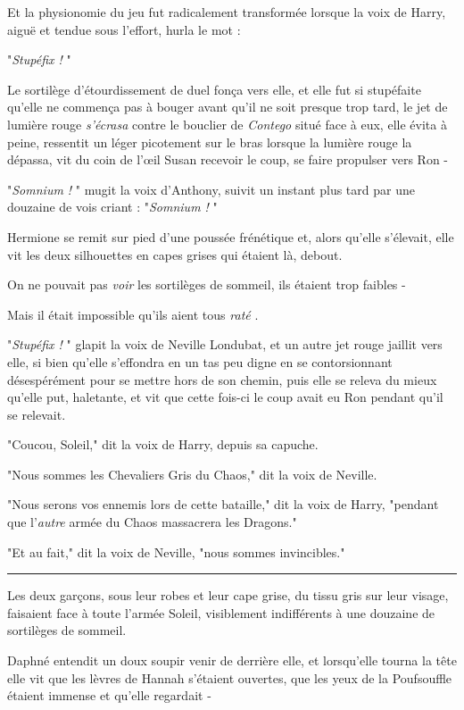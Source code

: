 Et la physionomie du jeu fut radicalement transformée lorsque la voix de Harry, aiguë et tendue sous l'effort, hurla le mot :

"\emph{Stupéfix !} "

Le sortilège d'étourdissement de duel fonça vers elle, et elle fut si stupéfaite qu'elle ne commença pas à bouger avant qu'il ne soit presque trop tard, le jet de lumière rouge \emph{s'écrasa}  contre le bouclier de \emph{Contego}  situé face à eux, elle évita à peine, ressentit un léger picotement sur le bras lorsque la lumière rouge la dépassa, vit du coin de l'œil Susan recevoir le coup, se faire propulser vers Ron -

"\emph{Somnium !} " mugit la voix d'Anthony, suivit un instant plus tard par une douzaine de vois criant : "\emph{Somnium !} "

Hermione se remit sur pied d'une poussée frénétique et, alors qu'elle s'élevait, elle vit les deux silhouettes en capes grises qui étaient là, debout.

On ne pouvait pas \emph{voir}  les sortilèges de sommeil, ils étaient trop faibles -

Mais il était impossible qu'ils aient tous \emph{raté} .

"\emph{Stupéfix !} " glapit la voix de Neville Londubat, et un autre jet rouge jaillit vers elle, si bien qu'elle s'effondra en un tas peu digne en se contorsionnant désespérément pour se mettre hors de son chemin, puis elle se releva du mieux qu'elle put, haletante, et vit que cette fois-ci le coup avait eu Ron pendant qu'il se relevait.

"Coucou, Soleil," dit la voix de Harry, depuis sa capuche.

"Nous sommes les Chevaliers Gris du Chaos," dit la voix de Neville.

"Nous serons vos ennemis lors de cette bataille," dit la voix de Harry, "pendant que l'\emph{autre } armée du Chaos massacrera les Dragons."

"Et au fait," dit la voix de Neville, "nous sommes invincibles."
\par\noindent\rule{\textwidth}{0.4pt}
Les deux garçons, sous leur robes et leur cape grise, du tissu gris sur leur visage, faisaient face à toute l'armée Soleil, visiblement indifférents à une douzaine de sortilèges de sommeil.

Daphné entendit un doux soupir venir de derrière elle, et lorsqu'elle tourna la tête elle vit que les lèvres de Hannah s'étaient ouvertes, que les yeux de la Poufsouffle étaient immense et qu'elle regardait -

